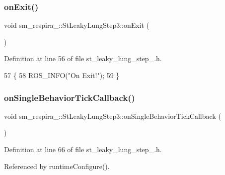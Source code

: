 \subsubsection{\texorpdfstring{on\+Exit()}{onExit()}}
{\footnotesize\ttfamily void sm\+\_\+respira\+\_\+::\+St\+Leaky\+Lung\+Step3\+::on\+Exit (\begin{DoxyParamCaption}{ }\end{DoxyParamCaption})\hspace{0.3cm}{\ttfamily [inline]}}



Definition at line 56 of file st\+\_\+leaky\+\_\+lung\+\_\+step\+\_.\+h.


\begin{DoxyCode}
57     \{
58         ROS\_INFO(\textcolor{stringliteral}{"On Exit!"});
59     \}
\end{DoxyCode}
\mbox{\label{structsm__respira__1_1_1StLeakyLungStep3_a2d8634bd1a528c486d8d5f4454bbfef5}} 
\subsubsection{\texorpdfstring{on\+Single\+Behavior\+Tick\+Callback()}{onSingleBehaviorTickCallback()}}
{\footnotesize\ttfamily void sm\+\_\+respira\+\_\+::\+St\+Leaky\+Lung\+Step3\+::on\+Single\+Behavior\+Tick\+Callback (\begin{DoxyParamCaption}{ }\end{DoxyParamCaption})\hspace{0.3cm}{\ttfamily [inline]}}



Definition at line 66 of file st\+\_\+leaky\+\_\+lung\+\_\+step\+\_.\+h.



Referenced by runtime\+Configure().


